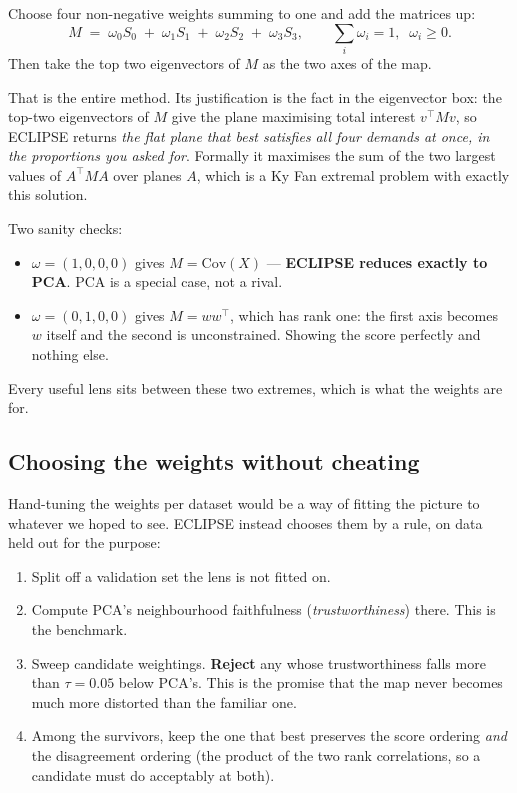 \documentclass[11pt]{article}
\begin{document}
Choose four non-negative weights summing to one and add the matrices up:
\[
  \boxed{\;
    M \;=\; \omega_0 S_0 \;+\; \omega_1 S_1 \;+\; \omega_2 S_2 \;+\; \omega_3 S_3,
    \qquad \textstyle\sum_i \omega_i = 1, \;\; \omega_i \ge 0.
  \;}
\]
Then take the top two eigenvectors of $M$ as the two axes of the map.

That is the entire method. Its justification is the fact in the eigenvector box: the
top-two eigenvectors of $M$ give the plane maximising total interest $v^\top M v$, so
ECLIPSE returns \emph{the flat plane that best satisfies all four demands at once, in
the proportions you asked for}. Formally it maximises the sum of the two largest values
of $A^\top M A$ over planes $A$, which is a Ky Fan extremal problem with exactly this
solution.

Two sanity checks:
\begin{itemize}[leftmargin=*, itemsep=2pt]
  \item $\omega = (1, 0, 0, 0)$ gives $M = \mathrm{Cov}(X)$ --- \textbf{ECLIPSE reduces
        exactly to PCA}. PCA is a special case, not a rival.
  \item $\omega = (0, 1, 0, 0)$ gives $M = ww^\top$, which has rank one: the first axis
        becomes $w$ itself and the second is unconstrained. Showing the score perfectly
        and nothing else.
\end{itemize}
Every useful lens sits between these two extremes, which is what the weights are for.

\subsection*{Choosing the weights without cheating}

Hand-tuning the weights per dataset would be a way of fitting the picture to whatever
we hoped to see. ECLIPSE instead chooses them by a rule, on data held out for the
purpose:

\begin{enumerate}[leftmargin=*, itemsep=3pt]
  \item Split off a validation set the lens is not fitted on.
  \item Compute PCA's neighbourhood faithfulness (\emph{trustworthiness}) there. This
        is the benchmark.
  \item Sweep candidate weightings. \textbf{Reject} any whose trustworthiness falls
        more than $\tau = 0.05$ below PCA's. This is the promise that the map never
        becomes much more distorted than the familiar one.
  \item Among the survivors, keep the one that best preserves the score ordering
        \emph{and} the disagreement ordering (the product of the two rank
        correlations, so a candidate must do acceptably at both).
\end{enumerate}
\end{document}
